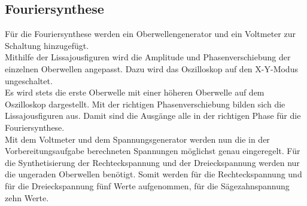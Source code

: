 \subsection{Fouriersynthese}
Für die Fouriersynthese werden ein Oberwellengenerator und ein Voltmeter zur Schaltung hinzugefügt.
\\Mithilfe der Lissajousfiguren wird die Amplitude und Phasenverschiebung der einzelnen Oberwellen angepasst.
Dazu wird das Oszilloskop auf den X-Y-Modus ungeschaltet.
\\Es wird stets die erste Oberwelle mit einer höheren Oberwelle auf dem Oszilloskop dargestellt.
Mit der richtigen Phasenverschiebung bilden sich die Lissajousfiguren aus.
Damit sind die Ausgänge alle in der richtigen Phase für die Fouriersynthese.
\\Mit dem Voltmeter und dem Spannungsgenerator werden nun die in der Vorbereitungsaufgabe berechneten Spannungen möglichst genau eingeregelt.
Für die Synthetisierung der Rechteckspannung und der Dreieckspannung werden nur die ungeraden Oberwellen benötigt.
Somit werden für die Rechteckspannung und für die Dreieckspannung fünf Werte aufgenommen, für die Sägezahnspannung zehn Werte.
